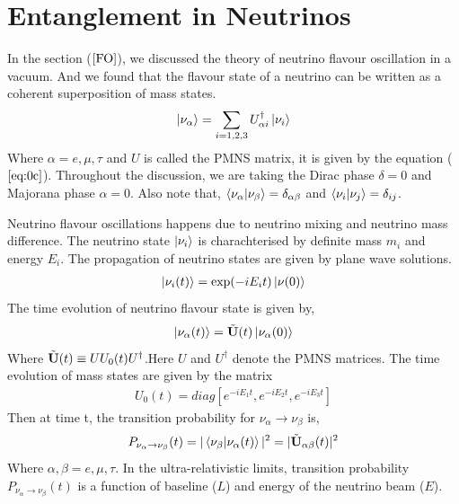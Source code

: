 \documentclass[12pt,a4paper]{report}
\begin{document}
\section{Entanglement in Neutrinos}
In the section ($\ref{FO}$), we discussed the theory of neutrino flavour oscillation in a vacuum. And we found that the flavour state of a neutrino can be written as a coherent superposition of mass states. 
\begin{equation}
	\ket{\nu_{\alpha}}=\sum_{i = 1,2,3} U^{\dagger} _{\alpha i}\ket{\nu_{i}}
\end{equation}
Where $\alpha = e,\mu,\tau$ and $U$ is called the PMNS matrix, it is given by the equation ($\ref{eq:0c}$). Throughout the discussion, we are taking the Dirac phase $\delta=0$ and Majorana phase $\alpha=0$. Also note that, $\braket{\nu_{\alpha}|\nu_{\beta}} = \delta_{\alpha\beta}$ and $\braket{\nu_{i}|\nu_{j}} = \delta_{ij}$.\par Neutrino flavour oscillations happens due to neutrino mixing and neutrino mass difference. The neutrino state $\ket{\nu_{i}}$ is charachterised by definite mass $m_{i}$ and energy $E_{i}$. The propagation of neutrino states are given by plane wave solutions.
\begin{gather*}
 \ket{\nu_{i}(t)} = \exp(-iE_{i}t)\ket{\nu(0)}   
\end{gather*}
The time evolution of neutrino flavour state is given by,
\begin{equation}
\label{eq:21}
\ket{\nu_{\alpha}(t)} =\Tilde{\textbf{U}}(t)\ket{\nu_{\alpha}(0)}
\end{equation}
Where $\Tilde{\textbf{U}}(t) \equiv U U_{0}(t)U^{\dagger}$.Here $U$ and $U^{\dagger}$ denote the PMNS matrices. The time evolution of mass states are given by the matrix
\begin{gather*}
  U_{0}(t) = diag[e^{-iE_{1}t}, e^{-iE_{2}t}, e^{-iE_{3}t}]  
\end{gather*}
Then at time t, the transition probability for $\nu_{\alpha} \rightarrow \nu_{\beta}$ is,
\begin{equation}
\label{eq:21b}
P_{\nu_{\alpha} \rightarrow \nu_{\beta}}(t) = |\braket{\nu_{\beta}|\nu_{\alpha}(t)}|^{2} = |\Tilde{\textbf{U}}_{\alpha\beta}(t)|^{2}
\end{equation}
Where $\alpha,\beta = e,\mu,\tau$. In the ultra-relativistic limits, transition probability $P_{\nu_{\alpha} \rightarrow \nu_{\beta}}(t)$ is a function of baseline ($L$) and energy of the neutrino beam ($E$).\par
\end{document}
